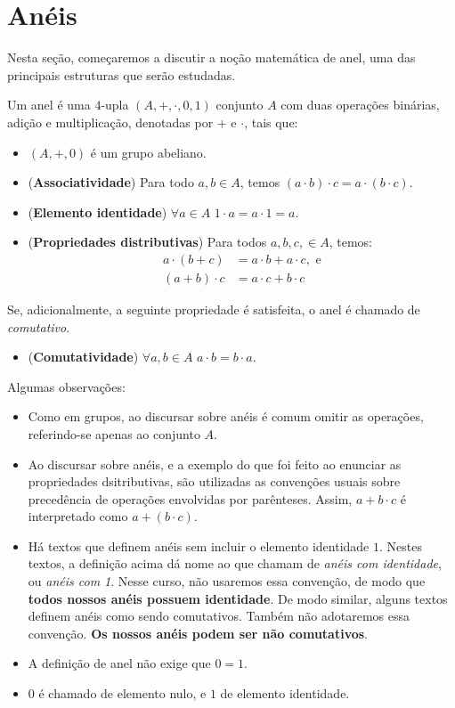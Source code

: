 
\chapter{Anéis}
Nesta seção, começaremos a discutir a noção matemática de anel, uma das principais estruturas que serão estudadas.
\begin{definition}[Anel]
    Um anel é uma $4$-upla $(A, +, \cdot, 0, 1)$ conjunto $A$ com duas operações binárias, adição e multiplicação, denotadas por $+$ e $\cdot$, tais que:
    \begin{itemize}
        \item $(A, +, 0)$ é um grupo abeliano.
        \item (\textbf{Associatividade}) Para todo $a, b \in A$, temos $(a \cdot b)\cdot c = a\cdot(b\cdot c)$.
        \item (\textbf{Elemento identidade}) $\forall a \in A$ $1 \cdot a = a \cdot 1 = a$.
        \item (\textbf{Propriedades distributivas}) Para todos $a, b, c, \in A$, temos:
        \begin{align*}
            a \cdot (b + c) &= a \cdot b + a \cdot c, \text{ e}\\
            (a + b) \cdot c &= a \cdot c + b \cdot c
        \end{align*}
    \end{itemize}
    Se, adicionalmente, a seguinte propriedade é satisfeita, o anel é chamado de \emph{comutativo}.
    \begin{itemize}
        \item (\textbf{Comutatividade}) $\forall a, b \in A$ $a \cdot b = b \cdot a$.
    \end{itemize}
\end{definition}

Algumas observações:
\begin{itemize}
    \item Como em grupos, ao discursar sobre anéis é comum omitir as operações, referindo-se apenas ao conjunto $A$.
    \item Ao discursar sobre anéis, e a exemplo do que foi feito ao enunciar as propriedades dsitributivas, são utilizadas as convenções usuais sobre precedência de operações envolvidas por parênteses. Assim, $a + b \cdot c$ é interpretado como $a + (b \cdot c)$.
    \item Há textos que definem anéis sem incluir o elemento identidade $1$. Nestes textos, a definição acima dá nome ao que chamam de \emph{anéis com identidade}, ou \emph{anéis com 1}. Nesse curso, não usaremos essa convenção, de modo que \textbf{todos nossos anéis possuem identidade}. De modo similar, alguns textos definem anéis como sendo comutativos. Também não adotaremos essa convenção. \textbf{Os nossos anéis podem ser não comutativos}.
    \item A definição de anel não exige que $0=1$.
    \item $0$ é chamado de elemento nulo, e $1$ de elemento identidade.
\end{itemize}

